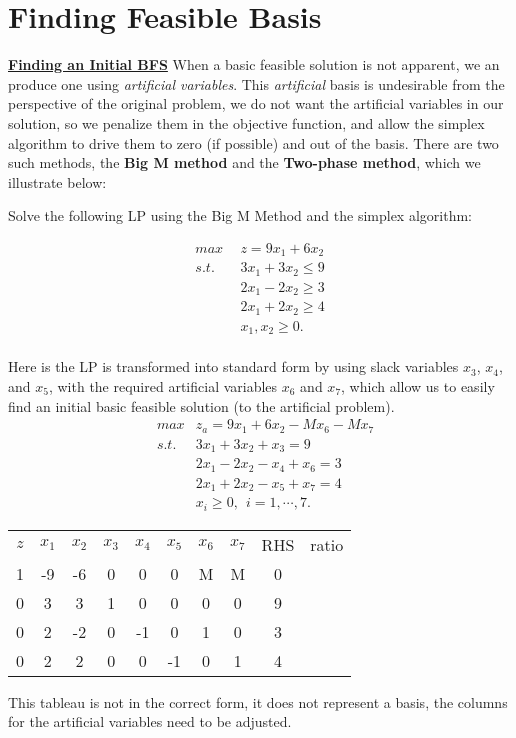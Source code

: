 \section{Finding Feasible Basis}

\underline{\bf Finding an Initial BFS}
When a basic feasible solution is not apparent, we an produce one using {\it artificial variables}.  This {\it artificial} basis is undesirable from the perspective of the original problem, we do not want the artificial variables in our solution, so we penalize them in the objective function, and allow the simplex algorithm to drive them to zero (if possible) and out of the basis.  There are two such methods, the {\bf Big M method} and the {\bf Two-phase method}, which we illustrate below:

\vspace{10mm}  Solve the following LP using the Big M Method and the simplex algorithm:

\begin{align*}
max~~ & z = 9x_1 + 6x_2 \\
s.t.~~
&  3x_1 + 3x_2 \le 9 \\
&  2x_1 - 2x_2 \ge 3 \\
&  2x_1 + 2x_2 \ge 4 \\
& x_1, x_2 \ge 0. \\
\end{align*}

Here is the LP is transformed into standard form by using slack variables $x_3$, $x_4$, and $x_5$, with the required artificial variables $x_6$ and $x_7$, which allow us to easily find an initial basic feasible solution (to the artificial problem).
\begin{eqnarray}
& max  & z_a = 9x_1 + 6x_2 -M x_6 - M x_7 \nonumber \\
& s.t. & 3x_1 + 3x_2 + x_3 = 9 \nonumber \\
&      & 2x_1 - 2x_2 - x_4 + x_6 = 3 \nonumber \\
&      & 2x_1 + 2x_2 - x_5 + x_7 = 4 \nonumber \\
&      & x_i \ge 0,~~ i =1,\cdots,7. \nonumber
\end{eqnarray}

\begin{center} \begin{tabular} {|c|c|c|c|c|c|c|c||c| r} \cline{1-9}
$z$	& $x_1$	& $x_2$	& $x_3$	& $x_4$	& $x_5$	& $x_6$	& $x_7$	& RHS &	ratio \\ \cline{1-9}
1	&	 -9 &	 -6 &	 0 &	  0 &	  0 &	  M &	  M &	0 & \\
0	&	  3 &	  3 &	 1 &	  0 &	  0 &	  0 &	  0 &	9 &	 \\
0	&	  2 &	 -2 &	 0 &	 -1 &	  0 &	  1 &	  0 &	3 & \\
0	&	  2 &	  2 &	 0 &	  0 &	 -1 &	  0 &	  1 &	4 &	 \\
\cline{1-9}
\end{tabular} \end{center}
\noindent This tableau is not in the correct form, it does not represent a basis, the columns for the artificial variables need to be adjusted.

